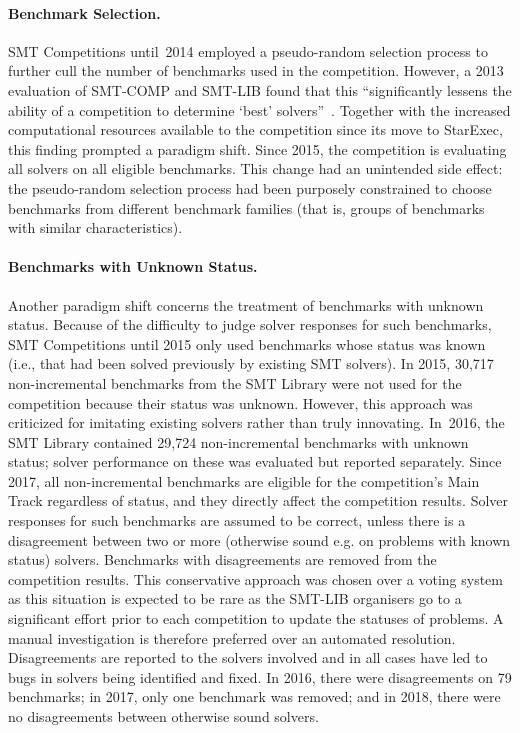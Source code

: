 \documentclass[dvipsnames,table,twoside,11pt]{article}
\newcommand{\maintrack}{Main Track\xspace}
\begin{document}
\paragraph{Benchmark Selection.}
SMT Competitions until~2014 employed a pseudo-random selection process
to further cull the number of benchmarks used in the competition.
However, a 2013 evaluation of SMT-COMP and SMT-LIB found that this
``significantly lessens the ability of a competition to determine
`best' solvers''~\cite{CSW15}. Together with the increased
computational resources available to the competition since its move to
StarExec, this finding prompted a paradigm shift.  Since 2015, the
competition is evaluating all solvers on all eligible benchmarks.
This change had an unintended side effect: the pseudo-random selection
process had been purposely constrained to choose benchmarks from
different benchmark families (that is, groups of benchmarks with
similar characteristics).

\paragraph{Benchmarks with Unknown Status.}
Another paradigm shift concerns the treatment of benchmarks with
unknown status.  Because of the difficulty to judge solver responses
for such benchmarks, SMT Competitions until 2015 only used benchmarks
whose status was known (i.e., that had been solved previously by
existing SMT solvers).  In 2015, 30,717 non-incremental benchmarks
from the SMT Library were not used for the competition because their
status was unknown.  However, this approach was criticized for
imitating existing solvers rather than truly innovating.  In~2016,
the SMT Library contained 29,724 non-incremental benchmarks with
unknown status; solver performance on these was evaluated but reported
separately.  Since 2017, all non-incremental benchmarks are eligible
for the competition's \maintrack regardless of status, and they
directly affect the competition results.  Solver responses for such
benchmarks are assumed to be correct, unless there is a disagreement
between two or more (otherwise sound e.g. on problems with known status) solvers.  Benchmarks with
disagreements are removed from the competition results.  This conservative approach was chosen over a voting system as this situation is expected to be rare as the SMT-LIB organisers go to a significant effort prior to each competition to update the statuses of problems. A manual investigation is therefore preferred over an automated resolution. Disagreements are reported to the solvers involved and in all cases have led to bugs in solvers being identified and fixed. 
In 2016,
there were disagreements on 79 benchmarks; in 2017, only one benchmark
was removed; and in 2018, there were no disagreements between
otherwise sound solvers.
\end{document}
